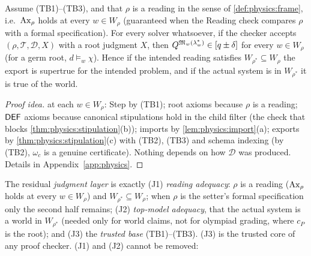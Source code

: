 \begin{theorem}\label{thm:physics:relative}
Assume (TB1)--(TB3), and that $\rho$ is a reading in the sense of
\cref{def:physics:frame}, i.e.\ $\mathrm{Ax}_\rho$ holds at every $w\in W_\rho$ (guaranteed when the
Reading check compares $\rho$ with a formal specification). For every solver whatsoever,
if the checker accepts $(\rho,\mathcal T,\mathcal D,X)$ with a root judgment $X$, then
$Q^{\mathfrak{M}_w(\lambda^*_w)}\in[q\pm\delta]$ for every $w\in W_\rho$ (for a germ root,
$d\models_w\chi$). Hence if the intended reading satisfies $W_{\rho^*}\subseteq W_\rho$ the
export is supertrue for the intended problem, and if the actual system is in
$W_{\rho^*}$ it is true of the world.
\end{theorem}
\begin{proof}[Proof idea]
 at each $w\in W_\rho$: Step by (TB1); root axioms because
$\rho$ is a reading; $\mathsf{DEF}$ axioms because canonical stipulations hold in the child filter
(the check that blocks \cref{thm:physics:stipulation}(b)); imports by
\cref{lem:physics:import}(a); exports by \cref{thm:physics:stipulation}(c) with (TB2), (TB3)
and schema indexing (by (TB2), $\omega_c$ is a genuine certificate). Nothing depends on how
$\mathcal D$ was produced. Details in Appendix~\ref{app:physics}.
\end{proof}

The residual \emph{judgment layer} is exactly (J1) \emph{reading adequacy}: $\rho$ is a
reading ($\mathrm{Ax}_\rho$ holds at every $w\in W_\rho$) and $W_{\rho^*}\subseteq W_\rho$; when
$\rho$ is the setter's formal specification only the second half remains; (J2)
\emph{top-model adequacy}, that the actual system is a world in $W_{\rho^*}$ (needed only
for world claims, not for olympiad grading, where $c_P$ is the root); and (J3) the
\emph{trusted base} (TB1)--(TB3). (J3) is the trusted core of any proof checker. (J1) and
(J2) cannot be removed:

